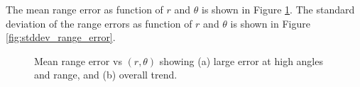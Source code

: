 		The mean range error as function of $r$ and $\theta$ is shown in Figure \ref{fig:mean_range_error}. The standard deviation of the range errors as function of $r$ and $\theta$ is shown in Figure \ref{fig:stddev_range_error}.
		\begin{figure}
	  		\centering
	  		\caption{Mean range error vs $(r,\theta)$ showing (a) large error at high angles and range, and (b) overall trend.}
	  		\label{fig:mean_range_error}
		\end{figure}
		
